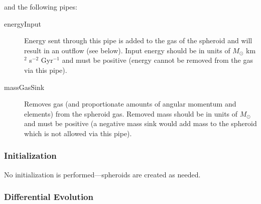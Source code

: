 and the following pipes:
\begin{description}
 \item [{\normalfont \ttfamily energyInput}] Energy sent through this pipe is added to the gas of the spheroid and will result in an outflow (see below). Input energy should be in units of $M_\odot$ km$^2$ s$^{-2}$ Gyr$^{-1}$ and must be positive (energy cannot be removed from the gas via this pipe).
 \item [{\normalfont \ttfamily massGasSink}] Removes gas (and proportionate amounts of angular momentum and elements) from the spheroid gas. Removed mass should be in units of $M_\odot$ and must be positive (a negative mass sink would add mass to the spheroid which is not allowed via this pipe).
\end{description}

\subsubsection{Initialization}

No initialization is performed---spheroids are created as needed.

\subsubsection{Differential Evolution}

